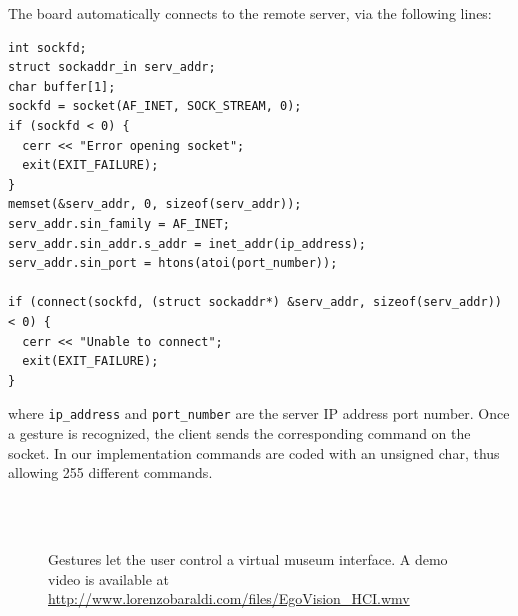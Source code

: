 The board automatically connects to the remote server, via the following lines:
\begin{lstlisting}[frame=single]
int sockfd;
struct sockaddr_in serv_addr;
char buffer[1];
sockfd = socket(AF_INET, SOCK_STREAM, 0);
if (sockfd < 0) {
  cerr << "Error opening socket";
  exit(EXIT_FAILURE);
}
memset(&serv_addr, 0, sizeof(serv_addr));
serv_addr.sin_family = AF_INET;
serv_addr.sin_addr.s_addr = inet_addr(ip_address);
serv_addr.sin_port = htons(atoi(port_number));

if (connect(sockfd, (struct sockaddr*) &serv_addr, sizeof(serv_addr)) < 0) {
  cerr << "Unable to connect";
  exit(EXIT_FAILURE);
}
\end{lstlisting}
where \verb+ip_address+ and \verb+port_number+ are the server IP address port number. Once a gesture is recognized, the client sends the corresponding command on the socket. In our implementation commands are coded with an unsigned char, thus allowing 255 different commands.

\begin{figure}
\centering
{} \\
 \\
\caption{Gestures let the user control a virtual museum interface. A demo video is available at \url{http://www.lorenzobaraldi.com/files/EgoVision_HCI.wmv}}
\label{fig:projector}
\end{figure}